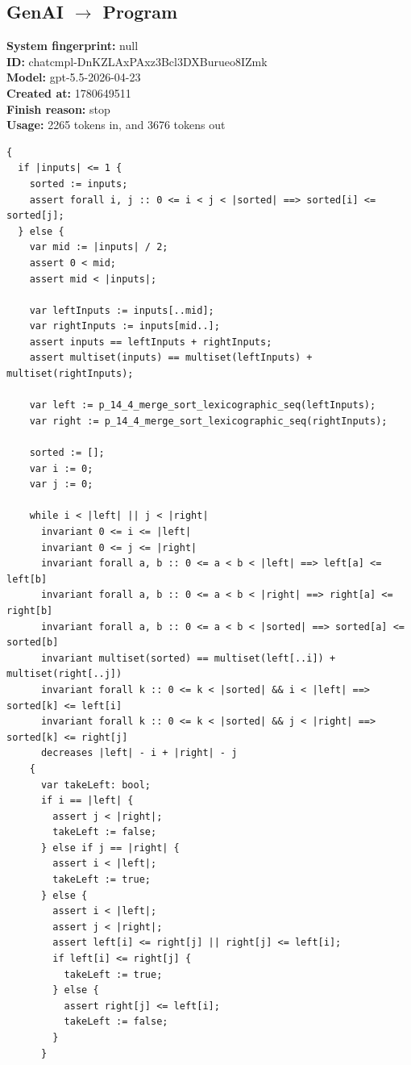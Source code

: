 \documentclass{article}
\begin{document}
\subsection*{GenAI $\rightarrow$ Program}
\textbf{System fingerprint: }null
\\\textbf{ID: }chatcmpl-DnKZLAxPAxz3Bcl3DXBurueo8IZmk
\\\textbf{Model: }gpt-5.5-2026-04-23
\\\textbf{Created at: }1780649511
\\\textbf{Finish reason: }stop
\\\textbf{Usage: }2265 tokens in, and 3676 tokens out
\begin{lstlisting}
{
  if |inputs| <= 1 {
    sorted := inputs;
    assert forall i, j :: 0 <= i < j < |sorted| ==> sorted[i] <= sorted[j];
  } else {
    var mid := |inputs| / 2;
    assert 0 < mid;
    assert mid < |inputs|;

    var leftInputs := inputs[..mid];
    var rightInputs := inputs[mid..];
    assert inputs == leftInputs + rightInputs;
    assert multiset(inputs) == multiset(leftInputs) + multiset(rightInputs);

    var left := p_14_4_merge_sort_lexicographic_seq(leftInputs);
    var right := p_14_4_merge_sort_lexicographic_seq(rightInputs);

    sorted := [];
    var i := 0;
    var j := 0;

    while i < |left| || j < |right|
      invariant 0 <= i <= |left|
      invariant 0 <= j <= |right|
      invariant forall a, b :: 0 <= a < b < |left| ==> left[a] <= left[b]
      invariant forall a, b :: 0 <= a < b < |right| ==> right[a] <= right[b]
      invariant forall a, b :: 0 <= a < b < |sorted| ==> sorted[a] <= sorted[b]
      invariant multiset(sorted) == multiset(left[..i]) + multiset(right[..j])
      invariant forall k :: 0 <= k < |sorted| && i < |left| ==> sorted[k] <= left[i]
      invariant forall k :: 0 <= k < |sorted| && j < |right| ==> sorted[k] <= right[j]
      decreases |left| - i + |right| - j
    {
      var takeLeft: bool;
      if i == |left| {
        assert j < |right|;
        takeLeft := false;
      } else if j == |right| {
        assert i < |left|;
        takeLeft := true;
      } else {
        assert i < |left|;
        assert j < |right|;
        assert left[i] <= right[j] || right[j] <= left[i];
        if left[i] <= right[j] {
          takeLeft := true;
        } else {
          assert right[j] <= left[i];
          takeLeft := false;
        }
      }


\end{lstlisting}
\end{document}
